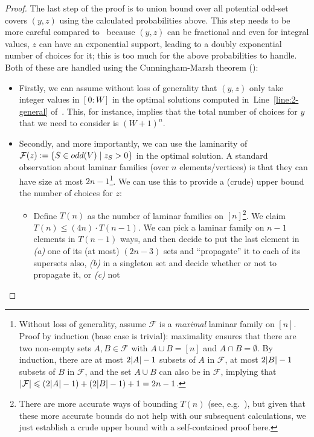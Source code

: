 \documentclass{article}
\renewcommand{\leq}{\leqslant}
\DeclarePairedDelimiter{\card}{\vert}{\vert}
\DeclarePairedDelimiter{\set}{\{}{\}}
\begin{document}
\begin{proof}
	 The last step of the proof is to union bound over all potential odd-set covers $(y,z)$ using the calculated probabilities above. 
	This step needs to be more careful compared to~ because $(y,z)$ can be fractional and even for integral values, $z$ can have  an exponential support, leading to a doubly exponential number of choices for it; this 
	is too much for the above probabilities to handle. Both of these are handled using the Cunningham-Marsh theorem (): 
		
	\begin{itemize}[leftmargin=10pt]
		\item Firstly, we can assume without loss of generality that $(y,z)$ only take integer values in $[0:W]$ in the optimal solutions computed in~Line~\eqref{line:2-general} of~. 
		This, for instance, implies that the total number of choices for $y$ that we need to consider is $(W+1)^{n}$. 
		\item Secondly, and more importantly, we can use the laminarity of $\mathcal{F}(z) := \set{S \in odd(V) \mid z_S > 0}$ in the optimal solution. 
		A standard observation about 
		laminar families (over $n$ elements/vertices) is that they can have size at most $2n-1$\footnote{Without loss of generality, assume $\mathcal{F}$ is a \emph{maximal} laminar family on $[n]$. 
		Proof by induction (base case is trivial): 
		maximality ensures that there are two non-empty sets $A,B \in \mathcal{F}$ with $A \cup B = [n]$ and $A \cap B = \emptyset$. By induction, there are at most $2\card{A}-1$ subsets of $A$ in $\mathcal{F}$, at most $2\card{B}-1$ subsets of $B$ in $\mathcal{F}$, 
		and the set $A \cup B$ can also be in $\mathcal{F}$, implying that $\card{\mathcal{F}} \leq (2\card{A}-1) + (2\card{B}-1) + 1 = 2n-1$.}. We can use this to provide a  (crude) upper bound
		the number of choices for $z$:
		\begin{itemize}
			\item Define $T(n)$ as the number of laminar families on $[n]$\footnote{There are more accurate ways of bounding $T(n)$ (see, e.g.~\cite{Bui-XuanHR12}), but given
			that these more accurate bounds do not help with our subsequent calculations, we just establish a crude upper bound with a self-contained proof here.}. We claim $T(n) \leq (4n) \cdot T(n-1)$. We can pick a laminar family on $n-1$ elements
			in $T(n-1)$ ways, and then decide to put the last element in \emph{(a)} one of its (at most) $(2n-3)$ sets and ``propagate'' it to each of its supersets also, \emph{(b)} in a singleton set and decide whether or not to propagate it, or \emph{(c)} not 

\end{itemize}
\end{itemize}
\end{proof}
\end{document}
